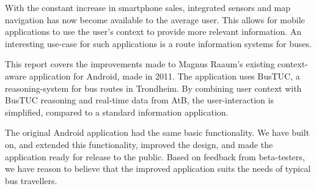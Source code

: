 With the constant increase in smartphone sales, integrated sensors and map navigation has now become available to the average user. This allows for mobile applications to use the user's context to provide more relevant information. An interesting use-case for such applications is a route information systems for buses.

This report covers the improvements made to Magnus Raaum's existing context-aware application for Android, made in 2011. The application uses BusTUC, a reasoning-system for bus routes in Trondheim. By combining user context with BusTUC reasoning and real-time data from AtB, the user-interaction is simplified, compared to a standard information application. 

The original Android application had the same basic functionality. We have built on, and extended this functionality, improved the design, and made the application ready for release to the public. Based on feedback from beta-testers, we have reason to believe that the improved application suits the needs of typical bus travellers.
